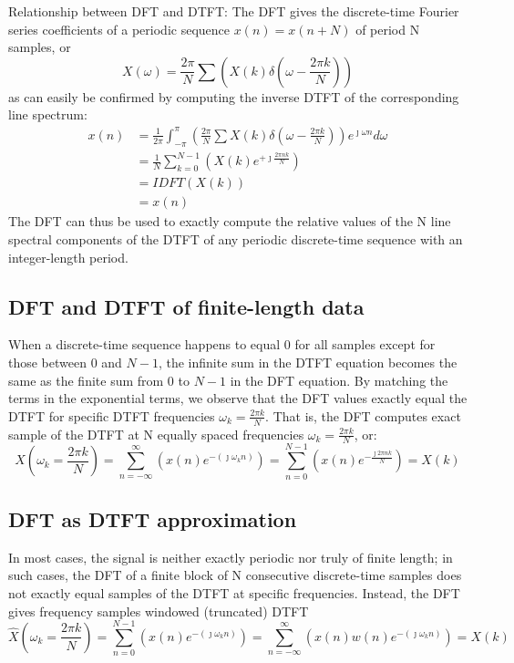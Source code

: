 \documentclass[10pt,english]{article}
\begin{document}
Relationship between DFT and DTFT:
The DFT gives the discrete-time Fourier series coefficients of a periodic sequence $x (n) = x (n + N)$ of period N samples, or
\begin{equation}
X(\omega) = \frac{2 \pi}{N} \sum \left( X(k) \delta \left( \omega - \frac{2 \pi k }{N}  \right)   \right)
\end{equation}
as can easily be confirmed by computing the inverse DTFT of the corresponding line spectrum:
\begin{equation}
\begin{split}
x(n) &= \frac{1}{2 \pi} \int_{- \pi}^{ \pi} \left( \frac{2 \pi}{N} \sum X(k) \delta \left( \omega - \frac{2 \pi k }{N}  \right)   \right) e^{\jmath \omega n} d \omega \\
&= \frac{1}{N} \sum_{k = 0}^{N-1} \left( X(k) e^{+ \jmath \frac{2 \pi n k}{N}} \right) \\
&= IDFT(X(k))\\
&= x(n)
\end{split}
\end{equation}
The DFT can thus be used to exactly compute the relative values of the N line spectral components of the DTFT of any periodic discrete-time sequence with an integer-length period.\\


\subsection{DFT and DTFT of finite-length data}
When a discrete-time sequence happens to equal 0 for all samples except for those between 0 and $N-1$, the infinite sum in the DTFT equation becomes the same as the finite sum from 0 to $N-1$ in the DFT equation. By matching the terms in the exponential terms, we observe that the DFT values exactly equal the DTFT for specific DTFT frequencies $\omega_k = \frac{2 \pi k}{N}$. That is, the DFT computes exact sample of the DTFT at N equally spaced frequencies $\omega_k = \frac{2 \pi k}{N} $, or:
\begin{equation}
X \left( \omega_k = \frac{2 \pi k}{N} \right) = \sum_{n = -\infty}^{ \infty} \left( x(n) e^{- \left( \jmath \omega_k n \right)} \right) = \sum_{n = 0}^{N-1} \left( x(n) e^{- \frac{\jmath 2 \pi n k}{N}} \right) = X(k)
\end{equation}


\subsection{DFT as DTFT approximation}
In most cases, the signal is neither exactly periodic nor truly of finite length; in such cases, the DFT of a finite block of N consecutive discrete-time samples does not exactly equal samples of the DTFT at specific frequencies. Instead, the DFT gives frequency samples windowed (truncated) DTFT
\begin{equation}
\hat{X} \left( \omega_k = \frac{2 \pi k}{N} \right)  = \sum_{n = 0}^{ N-1 } \left( x(n) e^{- \left( \jmath \omega_k n \right)} \right) = \sum_{n = -\infty}^{ \infty} \left( x(n) w(n) e^{- \left( \jmath \omega_k n \right)} \right) = X(k)
\end{equation}
\end{document}
